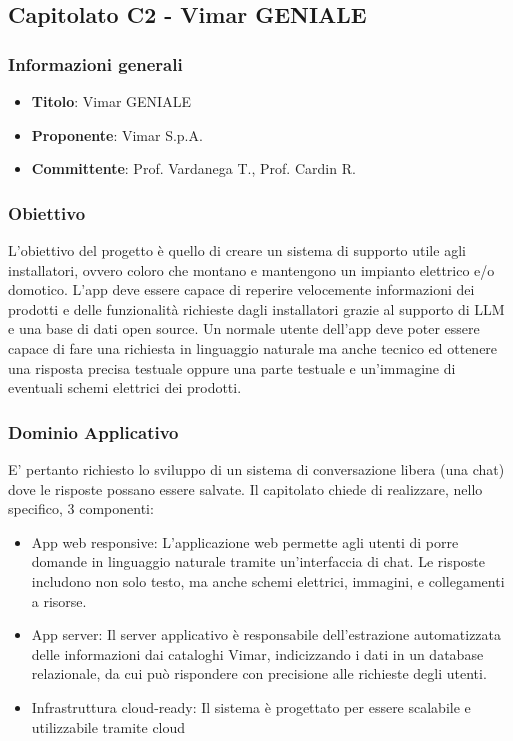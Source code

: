 \subsection{Capitolato C2 - Vimar GENIALE}
     \subsubsection{Informazioni generali}
        \begin{itemize}
            \item \textbf{Titolo}: Vimar GENIALE
            \item \textbf{Proponente}: Vimar S.p.A.
            \item \textbf{Committente}: Prof. Vardanega T., Prof. Cardin R.
        \end{itemize}
     \subsubsection{Obiettivo}
    L’obiettivo del progetto è quello di creare un sistema di supporto utile agli installatori, ovvero coloro che montano e mantengono un impianto elettrico e/o domotico. L’app deve essere capace di reperire velocemente informazioni dei prodotti e delle funzionalità richieste dagli installatori grazie al supporto di LLM e una base di dati open source. Un normale utente dell’app deve poter essere capace di fare una richiesta in linguaggio naturale ma anche tecnico ed ottenere una risposta precisa testuale oppure una parte testuale e un’immagine di eventuali schemi elettrici dei prodotti.

     \subsubsection{Dominio Applicativo}
E’ pertanto richiesto lo sviluppo di un sistema di conversazione libera (una chat) dove le risposte possano essere salvate. Il capitolato chiede di realizzare, nello specifico, 3 componenti:
\begin{itemize}
    \item App web responsive: L'applicazione web permette agli utenti di porre domande in linguaggio naturale tramite un’interfaccia di chat. Le risposte includono non solo testo, ma anche schemi elettrici, immagini, e collegamenti a risorse.
    \item App server:  Il server applicativo è responsabile dell’estrazione automatizzata delle informazioni dai cataloghi Vimar, indicizzando i dati in un database relazionale, da cui può rispondere con precisione alle richieste degli utenti.
    \item Infrastruttura cloud-ready: Il sistema è progettato per essere scalabile e utilizzabile tramite cloud
\end{itemize}    
